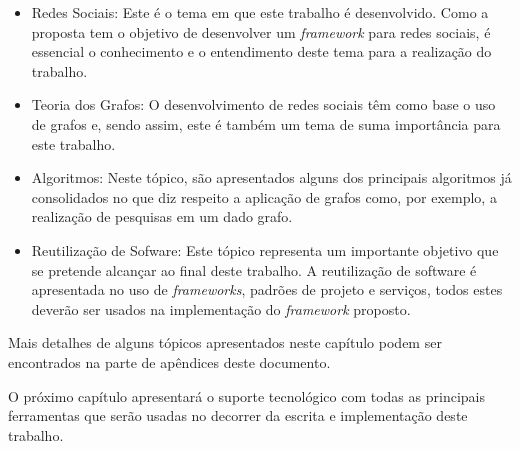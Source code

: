 \begin{itemize}
	\item Redes Sociais: Este é o tema em que este trabalho é desenvolvido. Como a proposta tem o objetivo de desenvolver um \textit{framework} para redes sociais, é essencial o conhecimento e o entendimento deste tema para a realização do trabalho.
	\item Teoria dos Grafos: O desenvolvimento de redes sociais têm como base o uso de grafos e, sendo assim, este é também um tema de suma importância para este trabalho.
	\item Algoritmos: Neste tópico, são apresentados alguns dos principais algoritmos já consolidados no que diz respeito a aplicação de grafos como, por exemplo, a realização de pesquisas em um dado grafo.
	\item Reutilização de Sofware: Este tópico representa um importante objetivo que se pretende alcançar ao final deste trabalho. A reutilização de software é apresentada no uso de \textit{frameworks}, padrões de projeto e serviços, todos estes deverão ser usados na implementação do \textit{framework} proposto.
\end{itemize}

Mais detalhes de alguns tópicos apresentados neste capítulo podem ser encontrados na parte de apêndices deste documento.

O próximo capítulo apresentará o suporte tecnológico com todas as principais ferramentas que serão usadas no decorrer da escrita e implementação deste trabalho.
